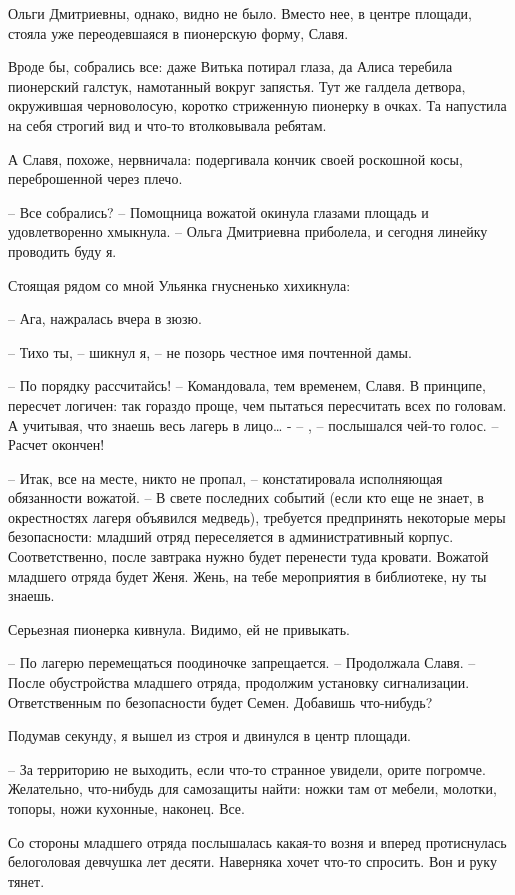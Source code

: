 \documentclass[a4paper]{book}
\begin{document}
Ольги Дмитриевны, однако, видно не было. Вместо нее, в центре площади, стояла уже переодевшаяся в пионерскую форму, Славя.

Вроде бы, собрались все: даже Витька потирал глаза, да Алиса теребила пионерский галстук, намотанный вокруг запястья. Тут же галдела детвора, окружившая черноволосую, коротко стриженную пионерку в очках. Та напустила на себя строгий вид и что-то втолковывала ребятам.

А Славя, похоже, нервничала: подергивала кончик своей роскошной косы, переброшенной через плечо. 

-- Все собрались? -- Помощница вожатой окинула глазами площадь и удовлетворенно хмыкнула. -- Ольга Дмитриевна приболела, и сегодня линейку проводить буду я. 

Стоящая рядом со мной Ульянка гнусненько хихикнула:

-- Ага, нажралась вчера в зюзю. 

-- Тихо ты, -- шикнул я, -- не позорь честное имя почтенной дамы.

-- По порядку рассчитайсь! -- Командовала, тем временем, Славя. В принципе, пересчет логичен: так гораздо проще, чем пытаться пересчитать всех по головам. А учитывая, что знаешь весь лагерь в лицо\ldots
-
-- , -- послышался чей-то голос. -- Расчет окончен!

-- Итак, все на месте, никто не пропал, -- констатировала исполняющая обязанности вожатой. -- В свете последних событий (если кто еще не знает, в окрестностях лагеря объявился медведь), требуется предпринять некоторые меры безопасности: младший отряд переселяется в административный корпус. Соответственно, после завтрака нужно будет перенести туда кровати. Вожатой младшего отряда будет Женя. Жень, на тебе мероприятия в библиотеке, ну ты знаешь.

Серьезная пионерка кивнула. Видимо, ей не привыкать.

-- По лагерю перемещаться поодиночке запрещается. -- Продолжала Славя. -- После обустройства младшего отряда, продолжим установку сигнализации. Ответственным по безопасности будет Семен. Добавишь что-нибудь?

Подумав секунду, я вышел из строя и двинулся в центр площади. 

-- За территорию не выходить, если что-то странное увидели, орите погромче. Желательно, что-нибудь для самозащиты найти: ножки там от мебели, молотки, топоры, ножи кухонные, наконец. Все. 

Со стороны младшего отряда послышалась какая-то возня и вперед протиснулась белоголовая девчушка лет десяти. Наверняка хочет что-то спросить. Вон и руку тянет.
\end{document}
